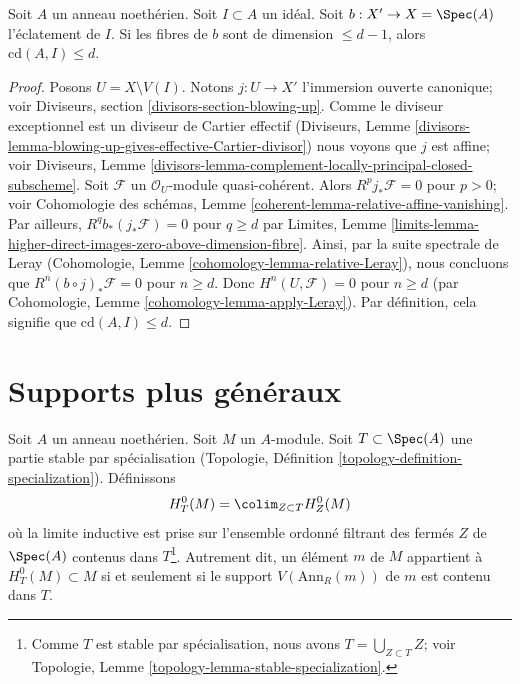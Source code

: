 \begin{lemma}
\label{lemma-cd-blowup}
Soit $A$ un anneau noethérien. Soit $I \subset A$ un idéal.
Soit $b : X' \to X = \Spec(A)$ l'éclatement de $I$.
Si les fibres de $b$ sont de dimension $\leq d - 1$, alors
$\text{cd}(A, I) \leq d$.
\end{lemma}

\begin{proof}
Posons $U = X \setminus V(I)$. Notons $j : U \to X'$ l'immersion ouverte
canonique; voir Diviseurs, section \ref{divisors-section-blowing-up}.
Comme le diviseur exceptionnel est un diviseur de Cartier effectif
(Diviseurs, Lemme
\ref{divisors-lemma-blowing-up-gives-effective-Cartier-divisor})
nous voyons que $j$ est affine; voir
Diviseurs, Lemme
\ref{divisors-lemma-complement-locally-principal-closed-subscheme}.
Soit $\mathcal{F}$ un $\mathcal{O}_U$-module quasi-cohérent.
Alors $R^pj_*\mathcal{F} = 0$ pour $p > 0$; voir
Cohomologie des schémas, Lemme
\ref{coherent-lemma-relative-affine-vanishing}.
Par ailleurs, $R^qb_*(j_*\mathcal{F}) = 0$ pour
$q \geq d$ par Limites, Lemme
\ref{limits-lemma-higher-direct-images-zero-above-dimension-fibre}.
Ainsi, par la suite spectrale de Leray
(Cohomologie, Lemme \ref{cohomology-lemma-relative-Leray}),
nous concluons que $R^n(b \circ j)_*\mathcal{F} = 0$ pour
$n \geq d$. Donc $H^n(U, \mathcal{F}) = 0$ pour $n \geq d$
(par Cohomologie, Lemme \ref{cohomology-lemma-apply-Leray}).
Par définition, cela signifie que $\text{cd}(A, I) \leq d$.
\end{proof}







\section{Supports plus généraux}
\label{section-supports}

\noindent
Soit $A$ un anneau noethérien. Soit $M$ un $A$-module.
Soit $T \subset \Spec(A)$ une partie stable par spécialisation
(Topologie, Définition \ref{topology-definition-specialization}).
Définissons
$$
H^0_T(M) = \colim_{Z \subset T} H^0_Z(M)
$$
où la limite inductive est prise sur l'ensemble ordonné filtrant des
fermés $Z$ de $\Spec(A)$ contenus dans
$T$\footnote{Comme $T$ est stable par spécialisation,
nous avons $T = \bigcup_{Z \subset T} Z$; voir
Topologie, Lemme \ref{topology-lemma-stable-specialization}.}.
Autrement dit, un élément $m$ de $M$ appartient à $H^0_T(M) \subset M$
si et seulement si le support $V(\text{Ann}_R(m))$ de $m$
est contenu dans $T$.

